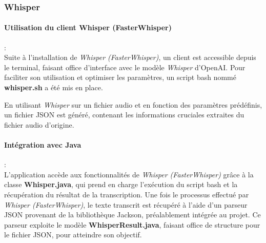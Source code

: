 \subsubsection{Whisper}
\label{sec:whisperImpl}

\paragraph*{Utilisation du client Whisper (FasterWhisper)} : \\

Suite à l'installation de \textit{Whisper (FasterWhisper)}, un client est accessible depuis le terminal, faisant office d'interface avec le modèle \textit{Whisper} d'OpenAI. 
Pour faciliter son utilisation et optimiser les paramètres, un script bash nommé \textbf{whisper.sh} a été mis en place.

En utilisant \textit{Whisper} sur un fichier audio et en fonction des paramètres prédéfinis, un fichier JSON est généré, contenant les informations cruciales extraites du fichier audio d'origine.

\paragraph*{Intégration avec Java} : \\

L'application accède aux fonctionnalités de \textit{Whisper (FasterWhisper)} grâce à la classe \textbf{Whisper.java}, qui prend en charge l'exécution du script bash et la récupération du résultat de la transcription. 
Une fois le processus effectué par \textit{Whisper (FasterWhisper)}, le texte transcrit est récupéré à l'aide d'un parseur JSON provenant de la bibliothèque Jackson, préalablement intégrée au projet. 
Ce parseur exploite le modèle \textbf{WhisperResult.java}, faisant office de structure pour le fichier JSON, pour atteindre son objectif.